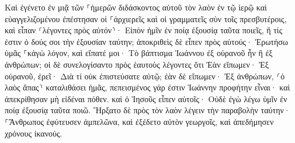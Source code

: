 \documentclass{openreader}
\begin{document}
Καὶ ἐγένετο ἐν μιᾷ τῶν ⸀ἡμερῶν διδάσκοντος αὐτοῦ τὸν λαὸν ἐν τῷ ἱερῷ καὶ εὐαγγελιζομένου ἐπέστησαν οἱ ⸀ἀρχιερεῖς καὶ οἱ γραμματεῖς σὺν τοῖς πρεσβυτέροις, 
καὶ εἶπαν ⸂λέγοντες πρὸς αὐτόν⸃· Εἰπὸν ἡμῖν ἐν ποίᾳ ἐξουσίᾳ ταῦτα ποιεῖς, ἢ τίς ἐστιν ὁ δούς σοι τὴν ἐξουσίαν ταύτην; 
ἀποκριθεὶς δὲ εἶπεν πρὸς αὐτούς· Ἐρωτήσω ὑμᾶς ⸀κἀγὼ λόγον, καὶ εἴπατέ μοι· 
Τὸ βάπτισμα Ἰωάννου ἐξ οὐρανοῦ ἦν ἢ ἐξ ἀνθρώπων; 
οἱ δὲ συνελογίσαντο πρὸς ἑαυτοὺς λέγοντες ὅτι Ἐὰν εἴπωμεν· Ἐξ οὐρανοῦ, ἐρεῖ· Διὰ τί οὐκ ἐπιστεύσατε αὐτῷ; 
ἐὰν δὲ εἴπωμεν· Ἐξ ἀνθρώπων, ⸂ὁ λαὸς ἅπας⸃ καταλιθάσει ἡμᾶς, πεπεισμένος γάρ ἐστιν Ἰωάννην προφήτην εἶναι· 
καὶ ἀπεκρίθησαν μὴ εἰδέναι πόθεν. 
καὶ ὁ Ἰησοῦς εἶπεν αὐτοῖς· Οὐδὲ ἐγὼ λέγω ὑμῖν ἐν ποίᾳ ἐξουσίᾳ ταῦτα ποιῶ. 
Ἤρξατο δὲ πρὸς τὸν λαὸν λέγειν τὴν παραβολὴν ταύτην· ⸀Ἄνθρωπος ἐφύτευσεν ἀμπελῶνα, καὶ ἐξέδετο αὐτὸν γεωργοῖς, καὶ ἀπεδήμησεν χρόνους ἱκανούς. 
\end{document}
